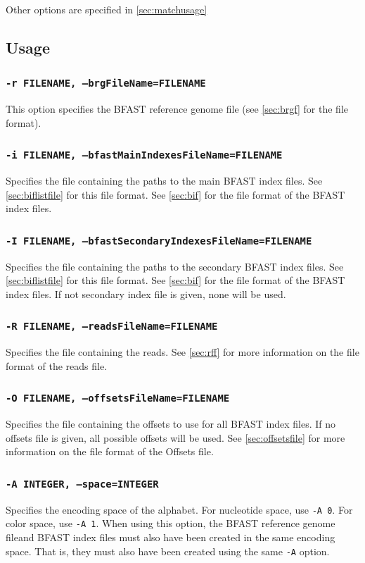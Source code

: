 \documentclass[a4paper,12pt]{book}
\newcommand{\TT}[1]{{\tt #1}} %
\newcommand{\BRGF}{BFAST reference genome file} %
\newcommand{\BIF}{BFAST index file} %
\begin{document}
Other options are specified in \autoref{sec:matchusage}

\subsection{Usage}
\label{sec:matchusage}

\subsubsection{\TT{-r FILENAME, --brgFileName=FILENAME}}
This option specifies the \BRGF{} (see \autoref{sec:brgf} for the file format).

\subsubsection{\TT{-i FILENAME, --bfastMainIndexesFileName=FILENAME}}
Specifies the file containing the paths to the main \BIF{s}.
See \autoref{sec:biflistfile} for this file format.
See \autoref{sec:bif} for the file format of the \BIF{s}.

\subsubsection{\TT{-I FILENAME, --bfastSecondaryIndexesFileName=FILENAME}}
Specifies the file containing the paths to the secondary \BIF{s}.
See \autoref{sec:biflistfile} for this file format.
See \autoref{sec:bif} for the file format of the \BIF{s}.
If not secondary index file is given, none will be used.
\subsubsection{\TT{-R FILENAME, --readsFileName=FILENAME}}
Specifies the file containing the reads.
See \autoref{sec:rff} for more information on the file format of the reads file.

\subsubsection{\TT{-O FILENAME, --offsetsFileName=FILENAME}}
Specifies the file containing the offsets to use for all \BIF{s}.
If no offsets file is given, all possible offsets will be used.
See \autoref{sec:offsetsfile} for more information on the file format of the Offsets file.

\subsubsection{\TT{-A INTEGER, --space=INTEGER}}
Specifies the encoding space of the alphabet.
For nucleotide space, use \TT{-A 0}.
For color space, use \TT{-A 1}.
When using this option, the \BRGF and \BIF{s} must also have been created in the same encoding space.
That is, they must also have been created using the same \TT{-A} option.
\end{document}
